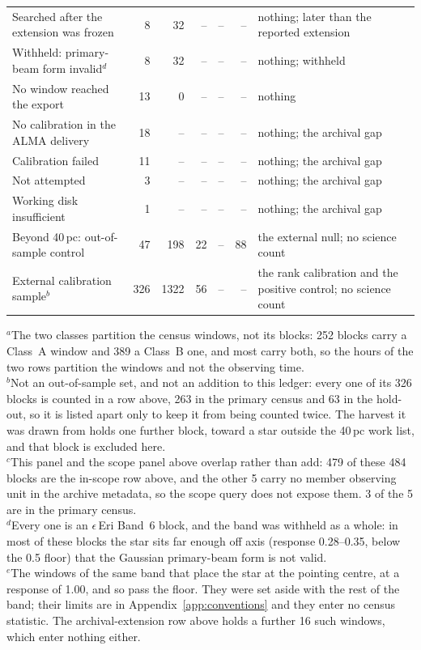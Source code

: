 \begin{tabular}{@{}p{}rrrrrp{}@{}}
\hspace{2.2em}Searched after the extension was frozen & 8 & 32 & -- & -- & -- & nothing; later than the reported extension \\
\hspace{2.2em}Withheld: primary-beam form invalid$^{d}$ & 8 & 32 & -- & -- & -- & nothing; withheld \\
\hspace{2.2em}No window reached the export & 13 & 0 & -- & -- & -- & nothing \\
\hspace{1.1em}No calibration in the ALMA delivery & 18 & -- & -- & -- & -- & nothing; the archival gap \\
\hspace{1.1em}Calibration failed & 11 & -- & -- & -- & -- & nothing; the archival gap \\
\hspace{1.1em}Not attempted & 3 & -- & -- & -- & -- & nothing; the archival gap \\
\hspace{1.1em}Working disk insufficient & 1 & -- & -- & -- & -- & nothing; the archival gap \\
\hline
Beyond 40\,pc: out-of-sample control & 47 & 198 & 22 & -- & 88 & the external null; no science count \\
External calibration sample$^{b}$ & 326 & 1322 & 56 & -- & -- & the rank calibration and the positive control; no science count \\
\hline
\end{tabular}

{\footnotesize $^{a}$The two classes partition the census windows, not its blocks: 252 blocks carry a Class~A window and 389 a Class~B one, and most carry both, so the hours of the two rows partition the windows and not the observing time.\\ $^{b}$Not an out-of-sample set, and not an addition to this ledger: every one of its 326 blocks is counted in a row above, 263 in the primary census and 63 in the hold-out, so it is listed apart only to keep it from being counted twice. The harvest it was drawn from holds one further block, toward a star outside the 40\,pc work list, and that block is excluded here.\\ $^{c}$This panel and the scope panel above overlap rather than add: 479 of these 484 blocks are the in-scope row above, and the other 5 carry no member observing unit in the archive metadata, so the scope query does not expose them. 3 of the 5 are in the primary census.\\ $^{d}$Every one is an $\epsilon$\,Eri Band~6 block, and the band was withheld as a whole: in most of these blocks the star sits far enough off axis (response 0.28--0.35, below the 0.5 floor) that the Gaussian primary-beam form is not valid.\\ $^{e}$The windows of the same band that place the star at the pointing centre, at a response of 1.00, and so pass the floor. They were set aside with the rest of the band; their limits are in Appendix~\ref{app:conventions} and they enter no census statistic. The archival-extension row above holds a further 16 such windows, which enter nothing either.}
